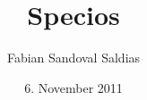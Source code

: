 \subject{Manifest}
\title{Specios}
\author{Fabian Sandoval Saldias}
\date{6. November 2011}
\publishers{\textrm{}\textrm{}}
